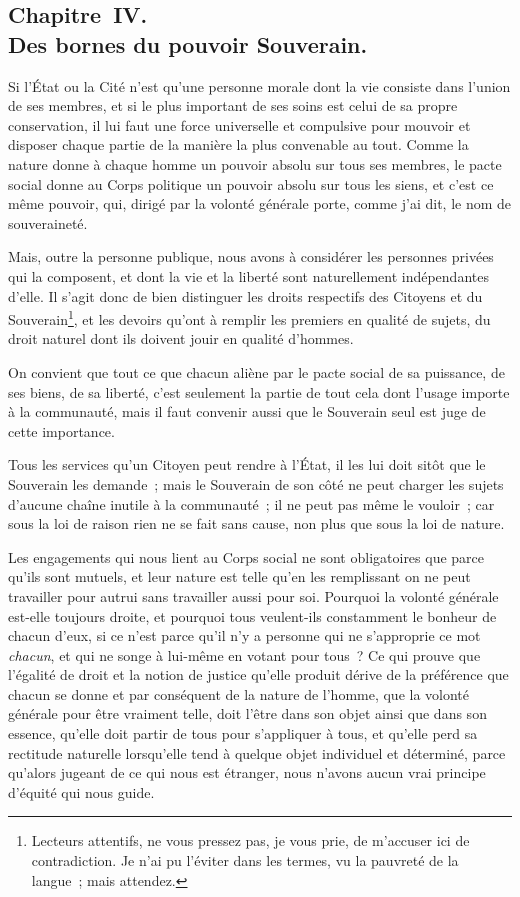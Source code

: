 \documentclass[french,twoside]{book} %
\begin{document}
\subsection[{Chapitre IV. Des bornes du pouvoir Souverain.}]{Chapitre IV. \\
Des bornes du pouvoir Souverain.}
\noindent Si l’État ou la Cité n’est qu’une personne morale dont la vie consiste dans l’union de ses membres, et si le plus important de ses soins est celui de sa propre conservation, il lui faut une force universelle et compulsive pour mouvoir et disposer chaque partie de la manière la plus convenable au tout. Comme la nature donne à chaque homme un pouvoir absolu sur tous ses membres, le pacte social donne au Corps politique un pouvoir absolu sur tous les siens, et c’est ce même pouvoir, qui, dirigé par la volonté générale porte, comme j’ai dit, le nom de souveraineté.\par
Mais, outre la personne publique, nous avons à considérer les personnes privées qui la composent, et dont la vie et la liberté sont naturellement indépendantes d’elle. Il s’agit donc de bien distinguer les droits respectifs des Citoyens et du Souverain\footnote{Lecteurs attentifs, ne vous pressez pas, je vous prie, de m’accuser ici de contradiction. Je n’ai pu l’éviter dans les termes, vu la pauvreté de la langue ; mais attendez.}, et les devoirs qu’ont à remplir les premiers en qualité de sujets, du droit naturel dont ils doivent jouir en qualité d’hommes.\par
On convient que tout ce que chacun aliène par le pacte social de sa puissance, de ses biens, de sa liberté, c’est seulement la partie de tout cela dont l’usage importe à la communauté, mais il faut convenir aussi que le Souverain seul est juge de cette importance.\par
Tous les services qu’un Citoyen peut rendre à l’État, il les lui doit sitôt que le Souverain les demande ; mais le Souverain de son côté ne peut charger les sujets d’aucune chaîne inutile à la communauté ; il ne peut pas même le vouloir ; car sous la loi de raison rien ne se fait sans cause, non plus que sous la loi de nature.\par
Les engagements qui nous lient au Corps social ne sont obligatoires que parce qu’ils sont mutuels, et leur nature est telle qu’en les remplissant on ne peut travailler pour autrui sans travailler aussi pour soi. Pourquoi la volonté générale est-elle toujours droite, et pourquoi tous veulent-ils constamment le bonheur de chacun d’eux, si ce n’est parce qu’il n’y a personne qui ne s’approprie ce mot {\itshape chacun}, et qui ne songe à lui-même en votant pour tous ? Ce qui prouve que l’égalité de droit et la notion de justice qu’elle produit dérive de la préférence que chacun se donne et par conséquent de la nature de l’homme, que la volonté générale pour être vraiment telle, doit l’être dans son objet ainsi que dans son essence, qu’elle doit partir de tous pour s’appliquer à tous, et qu’elle perd sa rectitude naturelle lorsqu’elle tend à quelque objet individuel et déterminé, parce qu’alors jugeant de ce qui nous est étranger, nous n’avons aucun vrai principe d’équité qui nous guide.\par
\end{document}
